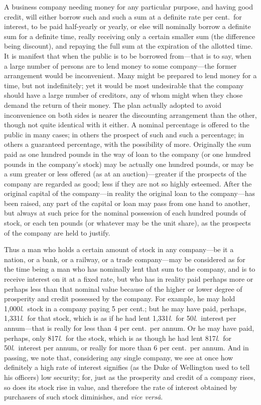 \documentclass[letterpaper,12pt,oneside,openany]{memoir}
\begin{document}
A business company needing money for any particular
purpose, and having good credit, will either
borrow such and such a sum at a definite rate per cent.\ for
interest, to be paid half-yearly or yearly, or else will
nominally borrow a definite sum for a definite time,
really receiving only a certain smaller sum (the difference
being discount), and repaying the full sum at the
expiration of the allotted time. It is manifest that
when the public is to be borrowed from---that is to say,
when a large number of persons are to lend money to
some company---the former arrangement would be inconvenient.
Many might be prepared to lend money for
a time, but not indefinitely; yet it would be most undesirable
that the company should have a large number
of creditors, any of whom might when they chose
demand the return of their money. The plan actually
adopted to avoid inconvenience on both sides is nearer
the discounting arrangement than the other, though
not quite identical with it either. A nominal percentage
is offered to the public in many cases; in others the
prospect of such and such a percentage; in others a
guaranteed percentage, with the possibility of more.
Originally the sum paid as one hundred pounds in the
way of loan to the company (or one hundred pounds in
the company's stock) may be actually one hundred
pounds, or may be a sum greater or less offered (as at
an auction)---greater if the prospects of the company
are regarded as good; less if they are not so highly
esteemed. After the original capital of the company---in
reality the original loan to the company---has been
raised, any part of the capital or loan may pass from
one hand to another, but always at such price for the
nominal possession of each hundred pounds of stock,
or each ten pounds (or whatever may be the unit share),
as the prospects of the company are held to justify.

Thus a man who holds a certain amount of stock in
any company---be it a nation, or a bank, or a railway,
or a trade company---may be considered as for the time
being a man who has nominally lent that sum to the
company, and is to receive interest on it at a fixed rate,
but who has in reality paid perhaps more or perhaps
less than that nominal value because of the higher or
lower degree of prosperity and credit possessed by the
company. For example, he may hold 1,000\textit{l}.\ stock in
a company paying 5 per cent.; but he may have paid,
perhaps, 1,331\textit{l}.\ for that stock, which is as if he had
lent 1,331\textit{l}.\ for 50\textit{l}.\ interest per annum---that is really
for less than 4 per cent.\ per annum. Or he may have
paid, perhaps, only 817\textit{l}.\ for the stock, which is as
though he had lent 817\textit{l}.\ for 50\textit{l}.\ interest per annum,
or really for more than 6 per cent.\ per annum. And in
passing, we note that, considering any single company,
we see at once how definitely a high rate of interest
signifies (as the Duke of Wellington used to tell his
officers) low security; for, just as the prosperity and
credit of a company rises, so does its stock rise in value,
and therefore the rate of interest obtained by purchasers
of such stock diminishes, and \textit{vice vers\^a}.
\end{document}
